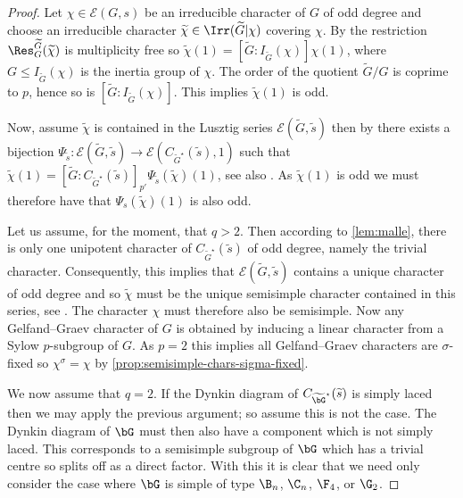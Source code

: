 \documentclass[eqthmnum, nocolour]{jt-calcs}
\begin{document}
\begin{proof}
Let $\chi \in \mathcal{E}(G,s)$ be an irreducible character of $G$ of odd degree and choose an irreducible character $\widetilde{\chi} \in \Irr(\widetilde{G} |\chi)$ covering $\chi$. By \cite[Proposition 10]{lusztig:1988:reductive-groups-with-a-disconnected-centre} the restriction $\Res_G^{\widetilde{G}}(\widetilde{\chi})$ is multiplicity free so $\widetilde{\chi}(1) = [\widetilde{G}:I_{\widetilde{G}}(\chi)]\chi(1)$, where $G \leqslant I_{\widetilde{G}}(\chi)$ is the inertia group of $\chi$. The order of the quotient $\widetilde{G}/G$ is coprime to $p$, hence so is $[\widetilde{G}:I_{\widetilde{G}}(\chi)]$. This implies $\widetilde{\chi}(1)$ is odd.

Now, assume $\widetilde{\chi}$ is contained in the Lusztig series $\mathcal{E}(\widetilde{G},\widetilde{s})$ then by \cite[4.23]{lusztig:1984:characters-of-reductive-groups} there exists a bijection $\Psi_{\widetilde{s}} : \mathcal{E}(\widetilde{G},\widetilde{s}) \to \mathcal{E}(C_{\widetilde{G}^{\star}}(\widetilde{s}),1)$ such that $\widetilde{\chi}(1) = [\widetilde{G} : C_{\widetilde{G}^{\star}}(\widetilde{s})]_{p'}\Psi_{\widetilde{s}}(\widetilde{\chi})(1)$, see also \cite[13.23, 13.24]{digne-michel:1991:representations-of-finite-groups-of-lie-type}. As $\widetilde{\chi}(1)$ is odd we must therefore have that $\Psi_s(\widetilde{\chi})(1)$ is also odd.

Let us assume, for the moment, that $q > 2$. Then according to \cref{lem:malle}, there is only one unipotent character of $C_{\widetilde{G}^{\star}}(\widetilde{s})$ of odd degree, namely the trivial character. Consequently, this implies that $\mathcal{E}(\widetilde{G},\widetilde{s})$ contains a unique character of odd degree and so $\widetilde{\chi}$ must be the unique semisimple character contained in this series, see \cite[8.4.8]{carter:1993:finite-groups-of-lie-type}. The character $\chi$ must therefore also be semisimple. Now any Gelfand--Graev character of $G$ is obtained by inducing a linear character from a Sylow $p$-subgroup of $G$. As $p=2$ this implies all Gelfand--Graev characters are $\sigma$-fixed so $\chi^{\sigma} = \chi$ by \cref{prop:semisimple-chars-sigma-fixed}.

We now assume that $q = 2$. If the Dynkin diagram of $C_{\widetilde{\bG}^{\star}}(\widetilde{s})$ is simply laced then we may apply the previous argument; so assume this is not the case. The Dynkin diagram of $\bG$ must then also have a component which is not simply laced. This corresponds to a semisimple subgroup of $\bG$ which has a trivial centre so splits off as a direct factor. With this it is clear that we need only consider the case where $\bG$ is simple of type $\B_n$, $\C_n$, $\F_4$, or $\G_2$.


\end{proof}
\end{document}
